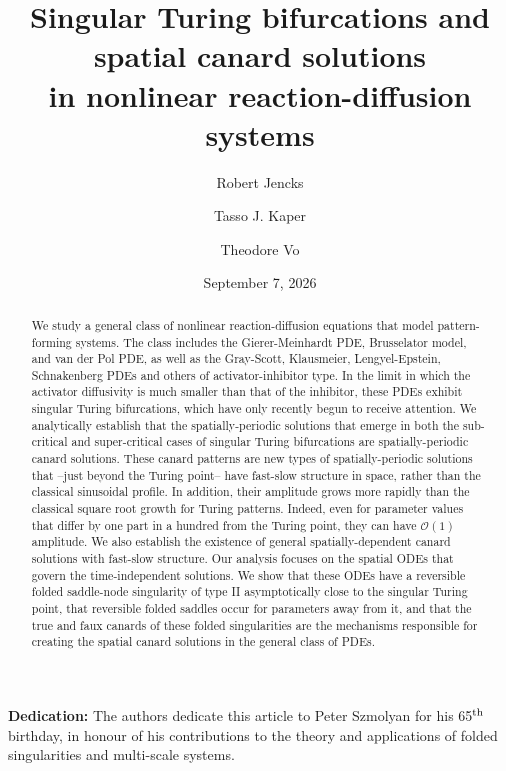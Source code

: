 \documentclass[11pt]{article}
\title{Singular Turing bifurcations and spatial canard solutions
\\ in nonlinear reaction-diffusion systems
}
\author[1]{Robert Jencks}
\author[1]{Tasso J. Kaper}
\author[2]{Theodore Vo}
\affil[1]{\footnotesize Department of Mathematics and Statistics, Boston University, Boston, MA 02215, USA}
\affil[2]{\footnotesize School of Mathematics, Monash University, Clayton, Victoria 3800, Australia}
\date{September 7, 2026}
\numberwithin{equation}{section}
\begin{document}
\maketitle

\begin{abstract}
We study a general class of nonlinear reaction-diffusion equations that model pattern-forming systems. 
The class includes the Gierer-Meinhardt PDE, Brusselator model, and van der Pol PDE, as well as the Gray-Scott, Klausmeier, Lengyel-Epstein, Schnakenberg PDEs and others of activator-inhibitor type. 
In the limit in which the activator diffusivity is much smaller than that of the inhibitor, these PDEs exhibit singular Turing bifurcations, which have only recently begun to receive attention.
We analytically establish that the spatially-periodic solutions that emerge in both the sub-critical and super-critical cases of singular Turing bifurcations are spatially-periodic canard solutions.
These canard patterns are new types of spatially-periodic solutions that --just beyond the Turing point-- have fast-slow structure in space, rather than the classical sinusoidal profile.
In addition, their amplitude grows more rapidly than the classical square root growth for Turing patterns.
Indeed, even for parameter values that differ by one part in a hundred from the Turing point, they can have $\mathcal{O}(1)$ amplitude.
We also establish the existence of general spatially-dependent canard solutions with fast-slow structure.
Our analysis focuses on the spatial ODEs that govern the time-independent solutions. 
We show that these ODEs have a reversible folded saddle-node singularity of type II asymptotically close to the singular Turing point, that reversible folded saddles occur for parameters away from it, and that the true and faux canards of these folded singularities are the mechanisms responsible for creating the spatial canard solutions in the general class of PDEs.
\end{abstract}

\noindent
{\bf Dedication:} The authors dedicate this article to Peter Szmolyan for his 65$^{\rm th}$ birthday, in honour of his contributions to the theory and applications of folded singularities and multi-scale systems. 
\end{document}

